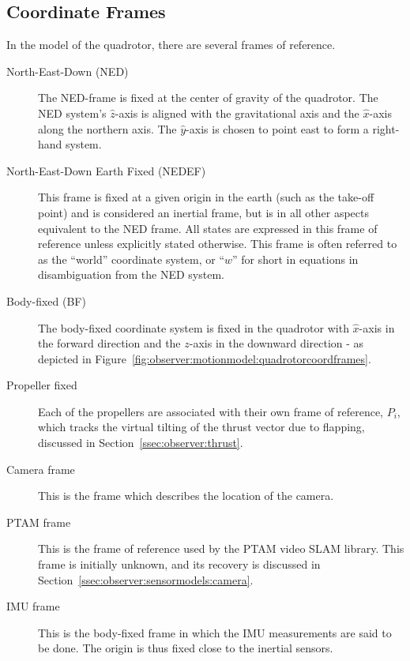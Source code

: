     \subsection{Coordinate Frames}
        In the model of the quadrotor, there are several frames of reference.
        \begin{description}
            \item[North-East-Down (NED)]
            The NED-frame is fixed at the center of gravity of the quadrotor.
            The NED system's $\hat{z}$-axis is aligned with the gravitational axis and
            the $\hat{x}$-axis along the northern axis.
            The $\hat{y}$-axis is chosen to point east to form a right-hand system.

            \item[North-East-Down Earth Fixed (NEDEF)] This frame is fixed at
            a given origin in the earth (such as the take-off point) and is
            considered an inertial frame, but is in all
            other aspects equivalent to the NED frame.
            All states are expressed in this frame of reference unless explicitly stated otherwise.
            This frame is often referred to as the ``world'' coordinate system,
            or ``$w$'' for short in equations in disambiguation from the NED system.

            \item[Body-fixed (BF)] The body-fixed coordinate system is fixed in the
            quadrotor with $\hat{x}$-axis in the forward direction and the $z$-axis in the downward
            direction - as depicted in Figure~\ref{fig:observer:motionmodel:quadrotorcoordframes}.

            \item[Propeller fixed] Each of the propellers are associated
            with their own frame of reference, $P_{i}$, which tracks the
            virtual tilting of the thrust vector due to flapping,
            discussed in Section~\ref{ssec:observer:thrust}.

            \item[Camera frame] This is the frame which describes the
            location of the camera.

            \item[PTAM frame] This is the frame of reference used by the PTAM video SLAM library.
            This frame is initially unknown, and its recovery is discussed in Section~\ref{ssec:observer:sensormodels:camera}.

            \item[IMU frame] This is the body-fixed frame in which the IMU measurements are said
            to be done. The origin is thus fixed close to the inertial sensors.
        \end{description}
